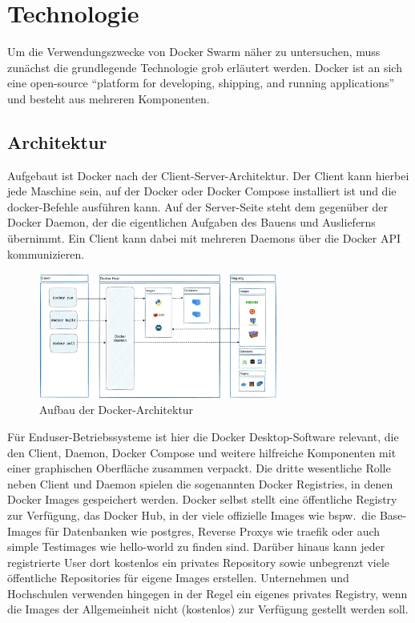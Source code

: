 \chapter{Technologie}\label{ch:technology}

Um die Verwendungszwecke von Docker Swarm näher zu untersuchen, muss zunächst die grundlegende Technologie grob erläutert werden. 
Docker ist an sich eine open-source ``platform for developing, shipping, and running applications''\cite{DockerInc} und besteht aus mehreren Komponenten. 

\section{Architektur}

Aufgebaut ist Docker nach der Client-Server-Architektur. Der Client kann hierbei jede Maschine sein, auf der Docker oder Docker Compose installiert ist und die docker-Befehle ausf\"uhren kann. 
Auf der Server-Seite steht dem gegen\"uber der Docker Daemon, der die eigentlichen Aufgaben des Bauens und Auslieferns \"ubernimmt. 
Ein Client kann dabei mit mehreren Daemons \"uber die Docker API kommunizieren. 

\begin{figure}[h]
    \centering
    \includegraphics[width=0.7\textwidth]{figures/docker-architecture.jpeg}
    \caption{Aufbau der Docker-Architektur\cite{DockerInc}}
    \label{fig:docker-architecture}
\end{figure}

F\"ur Enduser-Betriebssysteme ist hier die Docker Desktop-Software relevant, die den Client, Daemon, Docker Compose  und weitere hilfreiche Komponenten mit einer graphischen Oberfl\"ache zusammen verpackt. 
Die dritte wesentliche Rolle neben Client und Daemon spielen die sogenannten Docker Registries, in denen Docker Images gespeichert werden. 
Docker selbst stellt eine \"offentliche Registry zur Verf\"ugung, das Docker Hub, in der viele offizielle Images wie bspw.\ die Base-Images f\"ur Datenbanken wie postgres, Reverse Proxys wie traefik oder auch simple Testimages wie hello-world zu finden sind. 
Dar\"uber hinaus kann jeder registrierte User dort kostenlos ein privates Repository sowie unbegrenzt viele \"offentliche Repositories f\"ur eigene Images erstellen. 
Unternehmen und Hochschulen verwenden hingegen in der Regel ein eigenes privates Registry, wenn die Images der Allgemeinheit nicht (kostenlos) zur Verf\"ugung gestellt werden soll.

